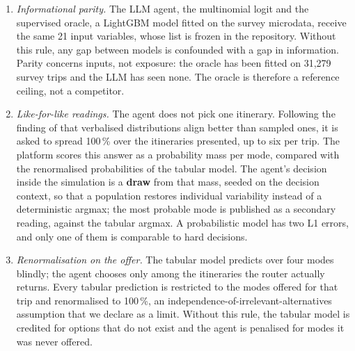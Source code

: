 \begin{enumerate}
  \item \emph{Informational parity.} The LLM agent, the multinomial logit and the supervised oracle, a LightGBM model \citep{ke2017lightgbm} fitted on the survey microdata, receive the same 21 input variables, whose list is frozen in the repository. %
  Without this rule, any gap between models is confounded with a gap in information. Parity concerns inputs, not exposure: the oracle has been fitted on 31,279 survey trips %
  and the LLM has seen none. The oracle is therefore a reference ceiling, not a competitor.
  \item \emph{Like-for-like readings.} The agent does not pick one itinerary. Following the finding of \citet{meister2024benchmarking} that verbalised distributions align better than sampled ones, it is asked to spread 100\,\% over the itineraries presented, up to six per trip. %
  The platform scores this answer as a probability mass per mode, compared with the renormalised probabilities of the tabular model. The agent's decision inside the simulation is a \textbf{draw} from that mass, seeded on the decision context, so that a population restores individual variability instead of a deterministic argmax; %
  the most probable mode is published as a secondary reading, against the tabular argmax. %
  A probabilistic model has two L1 errors, and only one of them is comparable to hard decisions.
  \item \emph{Renormalisation on the offer.} The tabular model predicts over four modes blindly; the agent chooses only among the itineraries the router actually returns. Every tabular prediction is restricted to the modes offered for that trip and renormalised to 100\,\%, an independence-of-irrelevant-alternatives assumption that we declare as a limit. Without this rule, the tabular model is credited for options that do not exist and the agent is penalised for modes it was never offered.
\end{enumerate}


